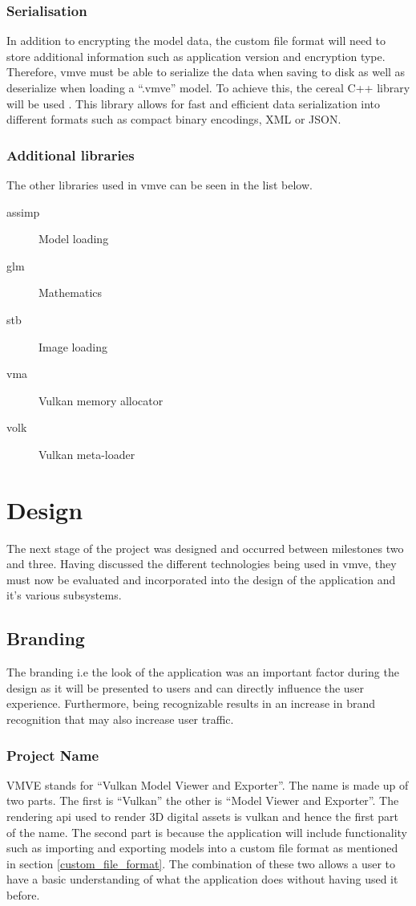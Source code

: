 \documentclass[11pt]{article}
\begin{document}
\subsubsection{Serialisation}
In addition to encrypting the model data, the custom file format will need to
store additional information such as application version and encryption type.
Therefore, \gls*{vmve} must be able to serialize the data when saving to disk as
well as deserialize when loading a ``.vmve'' model. To achieve this, the cereal
C++ library will be used \cite{cereal}. This library allows for fast and
efficient data serialization into different formats such as compact binary
encodings, XML or JSON.

\subsubsection{Additional libraries}
The other libraries used in \gls*{vmve} can be seen in the list below.
\begin{description}
  \item[assimp] Model loading
  \item[glm] Mathematics
  \item[stb] Image loading
  \item[vma] Vulkan memory allocator
  \item[volk] Vulkan meta-loader
\end{description}

\clearpage
\section{Design}
The next stage of the project was designed and occurred between milestones two
and three. Having discussed the different technologies being used in
\gls*{vmve}, they must now be evaluated and incorporated into the design of the
application and it's various subsystems.

\subsection{Branding}
The branding i.e the look of the application was an important factor during the
design as it will be presented to users and can directly influence the user
experience. Furthermore, being recognizable results in an increase in brand
recognition that may also increase user traffic.

\subsubsection{Project Name}
VMVE stands for ``Vulkan Model Viewer and Exporter''. The name is made up of
two parts. The first is ``Vulkan'' the other is ``Model Viewer and Exporter''.
The rendering \gls*{api} used to render 3D digital assets is \gls*{vulkan} and
hence the first part of the name. The second part is because the application
will include functionality such as importing and exporting models into a custom
file format as mentioned in section \ref{custom_file_format}. The combination of
these two allows a user to have a basic understanding of what the application
does without having used it before.
\end{document}
